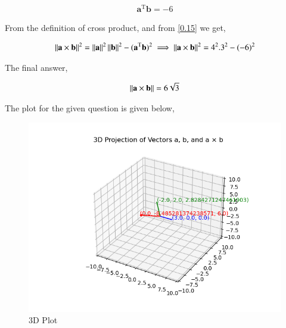 \documentclass[journal]{IEEEtran}
\begin{document}
\begin{align}
    \textbf{a}^\text{T}\textbf{b}=-6
    \label{0.15}
\end{align}

From the definition of cross product, and from \ref{0.15} we get,

\begin{align}
    \left\lVert\textbf{a} \times \textbf{b}\right\rVert^2 = \left\lVert\textbf{a}\right\rVert^2 \left\lVert\textbf{b}\right\rVert^2-(\textbf{a}^\text{T}\textbf{b})^2 
    \implies \left\lVert\textbf{a} \times \textbf{b}\right\rVert^2 = 4^2 . 3^2 -(-6)^2
    \label{0.16}
\end{align}

The final answer,

\begin{align}
    \left\lVert\textbf{a} \times \textbf{b}\right\rVert = 6\sqrt{3}
\end{align}

The plot for the given question is given below,

\begin{figure}[H]
    \centering
    \includegraphics[width=0.8\columnwidth]{figs/fig1.png}
    \caption{3D Plot}
    \label{3D Plot}
\end{figure}
\end{document}
